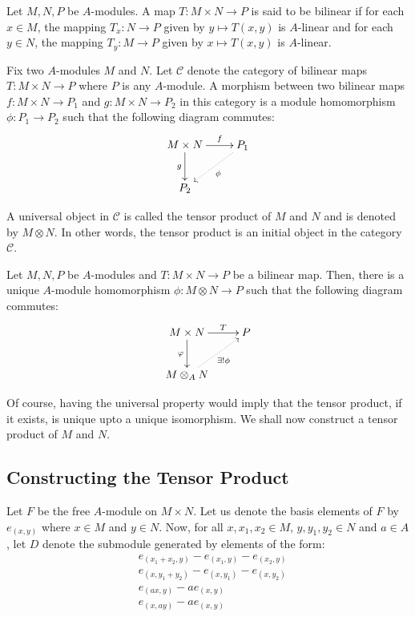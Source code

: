 \begin{definition}
    Let $M, N, P$ be $A$-modules. A map $T: M\times N\to P$ is said to be bilinear if for each $x\in M$, the mapping $T_x: N\to P$ given by $y\mapsto T(x,y)$ is $A$-linear and for each $y\in N$, the mapping $T_y: M\to P$ given by $x\mapsto T(x,y)$ is $A$-linear.
\end{definition}

Fix two $A$-modules $M$ and $N$. Let $\mathscr C$ denote the category of bilinear maps $T: M\times N\to P$ where $P$ is any $A$-module. A morphism between two bilinear maps $f: M\times N\to P_1$ and $g: M\times N\to P_2$ in this category is a module homomorphism $\phi: P_1\to P_2$ such that the following diagram commutes: 
\begin{equation*}
\xymatrix {
    M\times N\ar[r]^-f\ar[d]_g & P_1\ar@{.>}[ld]^\phi\\
    P_2
}
\end{equation*}

A universal object in $\mathscr C$ is called the tensor product of $M$ and $N$ and is denoted by $M\otimes N$. In other words, the tensor product is an initial object in the category $\mathscr C$.

\begin{definition}
    Let $M,N,P$ be $A$-modules and $T: M\times N\to P$ be a bilinear map. Then, there is a unique $A$-module homomorphism $\phi: M\otimes N\to P$ such that the following diagram commutes: 
    \begin{equation*}
    \xymatrix {
        M\times N\ar[r]^-T\ar[d]_\varphi & P\\
        M\otimes_A N\ar@{.>}[ru]_{\exists!\phi}
    }
    \end{equation*}
\end{definition}

Of course, having the universal property would imply that the tensor product, if it exists, is unique upto a unique isomorphism. We shall now construct a tensor product of $M$ and $N$.

\subsection*{Constructing the Tensor Product}

Let $F$ be the free $A$-module on $M\times N$. Let us denote the basis elements of $F$ by $e_{(x,y)}$ where $x\in M$ and $y\in N$. Now, for all $x,x_1,x_2\in M$, $y,y_1,y_2\in N$ and $a\in A$, let $D$ denote the submodule generated by elements of the form: 
\begin{align*}
    &e_{(x_1 + x_2, y)} - e_{(x_1,y)} - e_{(x_2,y)}\\
    &e_{(x,y_1 + y_2)} - e_{(x,y_1)} - e_{(x,y_2)}\\
    &e_{(ax,y)} - ae_{(x,y)}\\
    &e_{(x,ay)} - ae_{(x,y)}
\end{align*}

